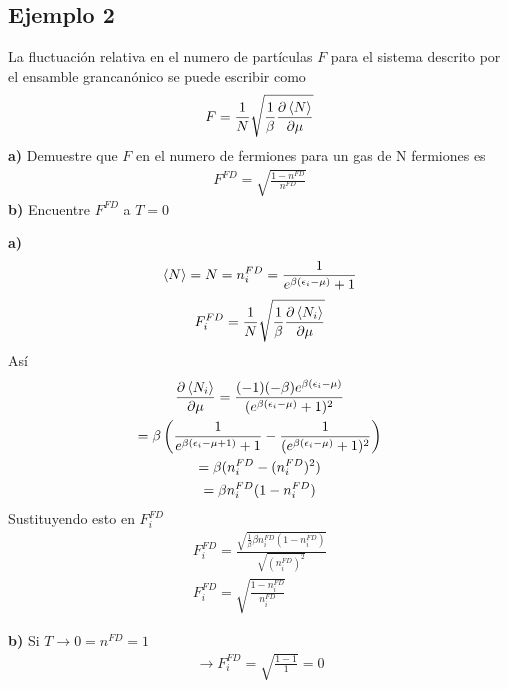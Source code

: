 \documentclass{article}
\begin{document}
\subsection{Ejemplo 2 }
La fluctuación relativa en el numero de partículas $ F  $ para el sistema descrito por el ensamble grancanónico se puede escribir como 
\begin{gather*}
  F = \frac{1}{N } \sqrt{\frac{1}{\beta} \frac{\partial \expval{N } }{\partial \mu }}  
\end{gather*}
\textbf{a) } Demuestre que $ F  $ en el numero de fermiones para un gas de N fermiones es 
\begin{gather*}
  F ^ {FD } = \sqrt{\frac{1 - n ^ {FD }}{n ^ {FD }}}  
\end{gather*}
\textbf{b) } Encuentre $ F ^ {FD } $ a $ T = 0  $

\hfill 

\textbf{a) } 
\begin{gather*}
  \expval{N } = N = n_i ^ {FD } = \frac{1}{e ^ {\beta( \epsilon_i - \mu )} + 1 } 
\end{gather*}
\begin{gather*}
  F_i ^ {FD } = \frac{1}{N } \sqrt{\frac{1}{\beta} \frac{\partial \expval{N_i } }{\partial \mu}}  
\end{gather*}
Así 
\begin{gather*}
  \frac{\partial \expval{N_i } }{\partial \mu} = \frac{(- 1) (-\beta) e ^ {\beta(\epsilon_i - \mu)}}{(e ^ {\beta(\epsilon_i - \mu)} + 1 )^2 }\\
  = \beta \left(\frac{1}{e ^ {\beta(\epsilon_i - \mu + 1 )} + 1 } - \frac{1}{(e ^ {\beta(\epsilon_i - \mu) } + 1 )^2}\right) \\
  = \beta(n_i ^ {FD } - (n_i ^ {FD})^2) \\
  = \beta n_i ^ {FD } (1 - n_i ^ {FD })
\end{gather*}
Sustituyendo esto en $ F_i ^ {FD } $
\begin{gather*}
  F_i ^ {FD } = \frac{\sqrt{\frac{1}{\beta} \beta n_i ^ {FD }( 1 - n_i ^ {FD })} }{\sqrt{(n_i ^ {FD})^2} } \\
  F_i ^ {FD } = \sqrt{\frac{1 - n_i ^ {FD }}{n_i ^ {FD }}} 
\end{gather*}

\hfill 

\hfill

\textbf{b) } Si $ T \rightarrow 0 = n ^ {FD } = 1  $
\begin{gather*}
  \rightarrow F_i ^ {FD } = \sqrt{\frac{1 - 1 }{1}} = 0  
\end{gather*}
\end{document}
